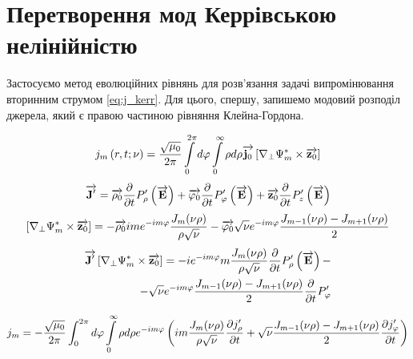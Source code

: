 \section{Перетворення мод Керрівською нелінійністю}

Застосуємо метод еволюційних рівнянь для розв'язання задачі випромінювання 
вторинним струмом \eqref{eq:j_kerr}. Для цього, спершу, запишемо модовий
розподіл джерела, який є правою частиною рівняння Клейна-Гордона. 

\textcolor{blue} { \begin{equation*}
j_m \left( r, t; \nu \right) = \frac{\sqrt{\mu_0}}{2\pi} 
\int \limits_{0}^{2\pi} d \varphi \int \limits_0^\infty \rho d \rho 
\overrightarrow{\mathbf j_0} \left[  \nabla_\perp \Psi_m^*  \times  \overrightarrow{\mathbf z_0}  \right]
\end{equation*} }
%
\textcolor{blue} { \begin{equation*} 
\overrightarrow{\mathbf J^\prime} = 
\overrightarrow{\mathbf \rho_0}    \frac{\partial }{\partial t} P_\rho^\prime    \left( \overrightarrow{\mathbf E} \right) + 
\overrightarrow{\mathbf \varphi_0} \frac{\partial }{\partial t} P_\varphi^\prime \left( \overrightarrow{\mathbf E} \right) + 
\overrightarrow{\mathbf z_0}       \frac{\partial }{\partial t} P_z^\prime       \left( \overrightarrow{\mathbf E} \right) 
\end{equation*} }
%
\textcolor{blue} { \begin{equation*} \begin{aligned}
\left[  \nabla_\perp \Psi_m^*  \times  \overrightarrow{\mathbf z_0}  \right] =
- \overrightarrow{\mathbf \rho_0} i m e^{-im\varphi} \frac{J_m (\nu \rho)}{\rho \sqrt{\nu}}
- \overrightarrow{\mathbf \varphi_0} \sqrt{\nu} e^{-im\varphi} 
\frac{J_{m-1} (\nu \rho) - J_{m+1} (\nu \rho)}{2}
\end{aligned} \end{equation*} }
%
\textcolor{blue} { \begin{equation*} \begin{aligned}
\overrightarrow{\mathbf J^\prime} \left[  \nabla_\perp \Psi_m^*  \times  \overrightarrow{\mathbf z_0}  \right] = 
- i e^{-im\varphi} m \frac{J_m (\nu \rho)}{\rho \sqrt{\nu}}
\frac{\partial }{\partial t} P_\rho^\prime \left( \overrightarrow{\mathbf E} \right) - \\
- \sqrt{\nu} e^{-im\varphi} \frac{J_{m-1} (\nu \rho) - J_{m+1} (\nu \rho)}{2}
\frac{\partial }{\partial t} P_\varphi^\prime
\end{aligned} \end{equation*} }

\begin{equation*} \begin{aligned}
j_m = - \frac{\sqrt{\mu_0}}{2\pi} 
\int_{0}^{2\pi} d \varphi \int \limits_{0}^{\infty} \rho d \rho
e^{-im\varphi} \left( i  m \frac{J_m (\nu \rho)}{\rho \sqrt{\nu}}
\frac{\partial j_\rho^\prime}{\partial t} + \sqrt{\nu}
\frac{J_{m-1} (\nu \rho) - J_{m+1} (\nu \rho)}{2}
\frac{\partial j_\varphi^\prime}{\partial t} \right)
\end{aligned} \end{equation*}

